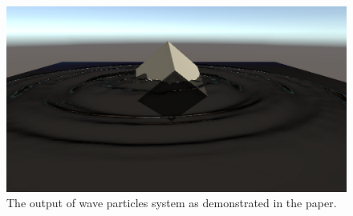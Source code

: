 \documentclass[a4paper,12pt,twoside,openright]{report}
\begin{document}

\begin{figure}[h]
\centering
\includegraphics[width=0.8\linewidth]{waveparticles_example}
\caption{The output of wave particles system as demonstrated in the paper.}
\label{fig:waveparticles_example}
\end{figure}
\end{document}
